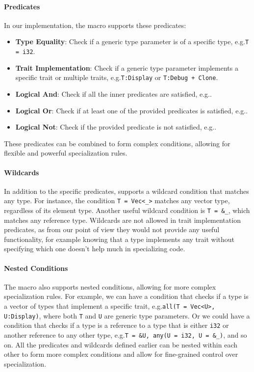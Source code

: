 \paragraph{Predicates}
In our implementation, the macro supports these predicates:
\begin{itemize}
	\item \textbf{Type Equality}: Check if a generic type parameter is of a specific type, e.g.\@ \mbox{\texttt{T = i32}}.
	\item \textbf{Trait Implementation}: Check if a generic type parameter implements a specific trait or multiple traits, e.g.\@ \mbox{\texttt{T:\@ Display}} or \mbox{\texttt{T:\@ Debug + Clone}}.
	\item \textbf{Logical And}: Check if all the inner predicates are satisfied, e.g.\@ {}.
	\item \textbf{Logical Or}: Check if at least one of the provided predicates is satisfied, e.g.\@ {}.
	\item \textbf{Logical Not}: Check if the provided predicate is not satisfied, e.g.\@ {}.
\end{itemize}
These predicates can be combined to form complex conditions, allowing for flexible and powerful specialization rules.

\paragraph{Wildcards}
In addition to the specific predicates, \mytool{} supports a wildcard condition that matches any type.
For instance, the condition \mbox{\texttt{T = Vec<\_>}} matches any vector type, regardless of its element type.
Another useful wildcard condition is \mbox{\texttt{T = \&\_}}, which matches any reference type.
Wildcards are not allowed in trait implementation predicates, as from our point of view they would not provide any useful functionality, for example knowing that a type implements any trait without specifying which one doesn't help much in specializing code.

\paragraph{Nested Conditions}
The macro also supports nested conditions, allowing for more complex specialization rules.
For example, we can have a condition that checks if a type is a vector of types that implement a specific trait, e.g.\@ \texttt{all(T = Vec<U>, U:\@ Display)}, where both \texttt{T} and \texttt{U} are generic type parameters.
Or we could have a condition that checks if a type is a reference to a type that is either \texttt{i32} or another reference to any other type, e.g.\@ \texttt{T = \&U, any(U = i32, U = \&\_)}, and so on.
All the predicates and wildcards defined earlier can be nested within each other to form more complex conditions and allow for fine-grained control over specialization.

